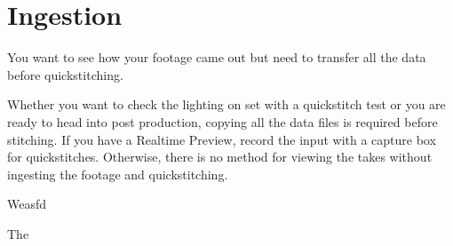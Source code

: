 \chapter{Ingestion}
\pagecolor{white}
\label{chap:??}
\begin{fullwidth}

\problem

{\large You want to see how your footage came out but need to transfer all the data before quickstitching. \par}

Whether you want to check the lighting on set with a quickstitch test or you are ready to head into post production, copying all the data files is required before stitching. If you have a Realtime Preview, record the input with a capture box for quickstitches. Otherwise, there is no method for viewing the takes without ingesting the footage and quickstitching. 

\solution

{\large Weasfd \par}

The 




\clearpage
\end{fullwidth}
